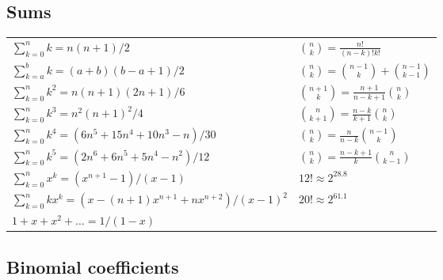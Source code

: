\documentclass[12pt]{extarticle}
\begin{document}
\begin{multicols*}{2}
\subsection{Sums}

\begin{tabular}{l l}
    $\sum_{k=0}^n k = n(n+1)/2$		& ${n \choose k} = \frac{n!}{(n-k)!k!}$ \\
    $\sum_{k=a}^b k = (a+b)(b-a+1)/2$   & ${n \choose k} = {n-1 \choose k} + {n-1 \choose k-1}$ \\
    $\sum_{k=0}^n k^2 = n(n+1)(2n+1)/6$ & ${n+1 \choose k} = \frac{n+1}{n-k+1} {n \choose k}$   \\
    $\sum_{k=0}^n k^3 = n^2(n+1)^2/4$   & ${n \choose k+1} = \frac{n-k}{k+1} {n \choose k}$     \\
    $\sum_{k=0}^n k^4 = (6n^5 + 15n^4 + 10n^3 - n)/30$  & ${n \choose k} = \frac{n}{n-k} {n-1 \choose k}$       \\
    $\sum_{k=0}^n k^5 = (2n^6 + 6n^5 + 5n^4 - n^2)/12$  & ${n \choose k} = \frac{n-k+1}{k} {n \choose k-1}$     \\
    $\sum_{k=0}^n x^k = (x^{n+1} - 1)/(x - 1)$  & $12! \approx 2^{28.8}$ \\
    $\sum_{k=0}^n kx^k = (x - (n+1)x^{n+1} + nx^{n+2})/(x-1)^2$	& $20! \approx 2^{61.1}$ \\
    $1 + x + x^2 + \dots = 1 / (1 - x)$
\end{tabular}


\subsection{Binomial coefficients}


\end{multicols*}
\end{document}
